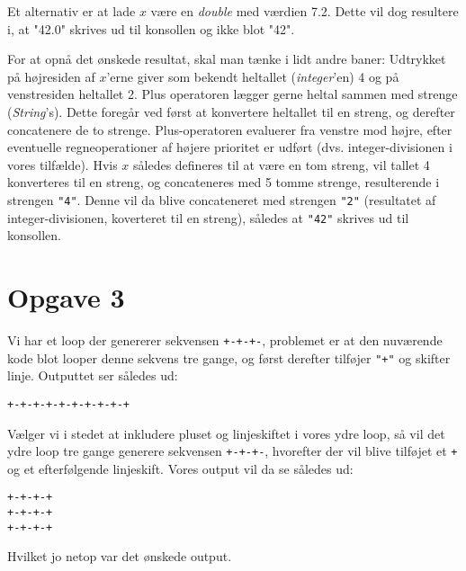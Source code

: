 \documentclass{scrartcl}
\newcommand\code[1]{\texttt{#1}}
\begin{document}
Et alternativ er at lade $x$ være en \emph{double} med værdien 7.2. Dette vil
dog resultere i, at "42.0" skrives ud til konsollen og ikke blot "42".

For at opnå det ønskede resultat, skal man tænke i lidt andre baner: Udtrykket
på højresiden af $x$'erne giver som bekendt heltallet (\emph{integer}'en) 4 og
på venstresiden heltallet 2. Plus operatoren lægger gerne heltal sammen med
strenge (\emph{String}'s). Dette foregår ved først at konvertere heltallet til
en streng, og derefter concatenere de to strenge. Plus-operatoren evaluerer fra
venstre mod højre, efter eventuelle regneoperationer af højere prioritet er
udført (dvs. integer-divisionen i vores tilfælde). Hvis $x$ således defineres
til at være en tom streng, vil tallet 4 konverteres til en streng, og
concateneres med 5 tomme strenge, resulterende i strengen \code{"4"}. Denne vil da
blive concateneret med strengen \code{"2"} (resultatet af integer-divisionen,
koverteret til en streng), således at \code{"42"} skrives ud til konsollen.

\section*{Opgave 3}
Vi har et loop der genererer sekvensen \code{+-+-+-}, problemet er at den nuværende kode blot looper denne sekvens tre gange, og først derefter tilføjer \code{"+"} og skifter linje. Outputtet ser således ud:
\begin{Verbatim}
+-+-+-+-+-+-+-+-+-+
\end{Verbatim}
Vælger vi i stedet at inkludere pluset og linjeskiftet i vores ydre loop, så vil det ydre loop tre gange generere sekvensen \code{+-+-+-}, hvorefter der vil blive tilføjet et \code{+} og et efterfølgende linjeskift.
Vores output vil da se således ud:
\begin{Verbatim}
+-+-+-+
+-+-+-+
+-+-+-+
\end{Verbatim}
Hvilket jo netop var det ønskede output.
\end{document}
